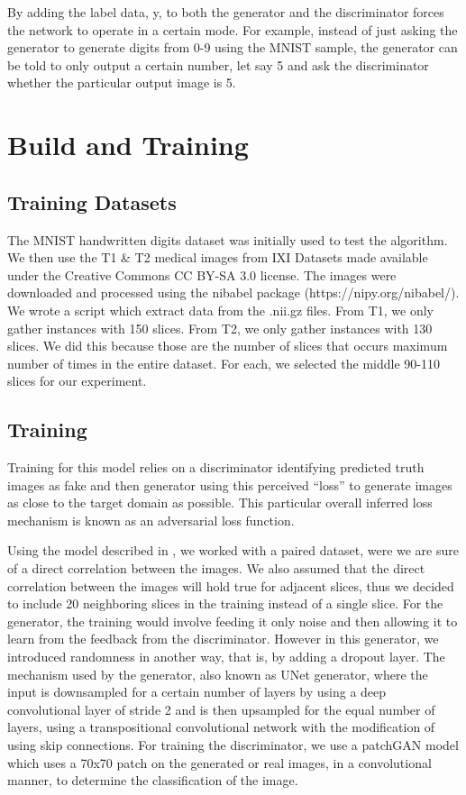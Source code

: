 \documentclass[conference]{IEEEtran}
\begin{document}
By adding the label data, y, to both the generator and the discriminator forces the network to operate in a certain mode. For example, instead of just asking the generator to generate digits from 0-9 using the MNIST sample, the generator can be told to only output a certain number, let say 5 and ask the discriminator whether the particular output image is 5.

\section{Build and Training}

\subsection{Training Datasets}

The MNIST handwritten digits dataset was initially used to test the algorithm. We then use the T1 \& T2 medical images from IXI Datasets \cite{dataset_ixi} made available under the Creative Commons CC BY-SA 3.0 license. The images were downloaded and processed using the nibabel package (https://nipy.org/nibabel/). We wrote a script which extract data from the .nii.gz files. From T1, we only gather instances with 150 slices. From T2, we only gather instances with 130 slices. We did this because those are the number of slices that occurs maximum number of times in the entire dataset. For each, we selected the middle 90-110 slices for our experiment.

\subsection{Training}
Training for this model relies on a discriminator identifying predicted truth images as fake and then generator using this perceived “loss” to generate images as close to the target domain as possible. This particular overall inferred loss mechanism is known as an adversarial loss function. 

Using the model described in \cite{pix2pix_ml}, we worked with a paired dataset, were we are sure of a direct correlation between the images. We also assumed that the direct correlation between the images will hold true for adjacent slices, thus we decided to include 20 neighboring slices in the training instead of a single slice. For the generator, the training would involve feeding it only noise and then allowing it to learn from the feedback from the discriminator. However in this generator, we introduced randomness in another way, that is, by adding a dropout layer. The mechanism used by the generator, also known as UNet generator, where the input is downsampled for a certain number of layers by using a deep convolutional layer of stride 2 and is then upsampled for the equal number of layers, using a transpositional convolutional network with the modification of using skip connections. For training the discriminator, we use a patchGAN model\cite{pix2pix_ml} which uses a 70x70 patch on the generated or real images, in a convolutional manner, to determine the classification of the image.
\end{document}

